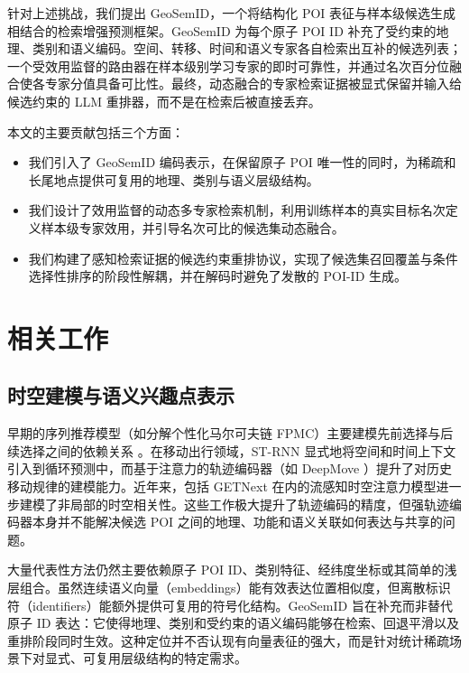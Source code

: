 \documentclass[10pt,fontset=none,twocolumn]{ctexart}
\begin{document}
针对上述挑战，我们提出 GeoSemID，一个将结构化 POI 表征与样本级候选生成相结合的检索增强预测框架。GeoSemID 为每个原子 POI ID 补充了受约束的地理、类别和语义编码。空间、转移、时间和语义专家各自检索出互补的候选列表；一个受效用监督的路由器在样本级别学习专家的即时可靠性，并通过名次百分位融合使各专家分值具备可比性。最终，动态融合的专家检索证据被显式保留并输入给候选约束的 LLM 重排器，而不是在检索后被直接丢弃。

本文的主要贡献包括三个方面：
\begin{itemize}
\item 我们引入了 GeoSemID 编码表示，在保留原子 POI 唯一性的同时，为稀疏和长尾地点提供可复用的地理、类别与语义层级结构。
\item 我们设计了效用监督的动态多专家检索机制，利用训练样本的真实目标名次定义样本级专家效用，并引导名次可比的候选集动态融合。
\item 我们构建了感知检索证据的候选约束重排协议，实现了候选集召回覆盖与条件选择性排序的阶段性解耦，并在解码时避免了发散的 POI-ID 生成。
\end{itemize}

\section{相关工作}
\label{sec:related_work}

\subsection{时空建模与语义兴趣点表示}
\label{subsec:rw_representation}

早期的序列推荐模型（如分解个性化马尔可夫链 FPMC）主要建模先前选择与后续选择之间的依赖关系 \cite{rendle2010}。在移动出行领域，ST-RNN \cite{liu2016} 显式地将空间和时间上下文引入到循环预测中，而基于注意力的轨迹编码器（如 DeepMove \cite{feng2018}）提升了对历史移动规律的建模能力。近年来，包括 GETNext \cite{yang2022} 在内的流感知时空注意力模型进一步建模了非局部的时空相关性。这些工作极大提升了轨迹编码的精度，但强轨迹编码器本身并不能解决候选 POI 之间的地理、功能和语义关联如何表达与共享的问题。

大量代表性方法仍然主要依赖原子 POI ID、类别特征、经纬度坐标或其简单的浅层组合。虽然连续语义向量（embeddings）能有效表达位置相似度，但离散标识符（identifiers）能额外提供可复用的符号化结构。GeoSemID 旨在补充而非替代原子 ID 表达：它使得地理、类别和受约束的语义编码能够在检索、回退平滑以及重排阶段同时生效。这种定位并不否认现有向量表征的强大，而是针对统计稀疏场景下对显式、可复用层级结构的特定需求。
\end{document}
